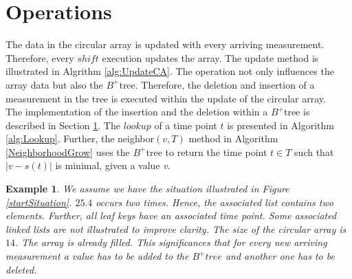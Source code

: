 \documentclass[abstracton,12pt]{scrreprt}
\newtheorem{example}{Example}
\begin{document}
\section{Operations}
\label{sec:OperationsOnBTree}
The data in the circular array is updated with every arriving measurement. Therefore, every $shift$ execution updates the array. The update method is illustrated in Algrithm \ref{alg:UpdateCA}. The operation not only influences the array data but also the $B^+$tree. Therefore, the deletion and insertion of a measurement in the tree is executed within the update of the circular array.\\ The implementation of the insertion and the deletion within a $B^+$tree is described in Section \ref{sec:OperationsOnBTree}. The $lookup$ of a time point $t$ is presented in Algorithm \ref{alg:Lookup}.
Further, the neighbor$(v,T)$ method in Algorithm \ref{NeighborhoodGrow} uses the $B^+$tree to return the time point $t \in T$ such that $|v-s(t)|$ is minimal, given a value \emph{v}.

\begin{example}
We assume we have the situation illustrated in Figure \ref{startSituation}. $25.4$ occurs two times. Hence, the associated list contains two elements. Further, all leaf keys have an associated time point. Some associated linked lists are not illustrated to improve clarity. The size of the circular array is $14$. The array is already filled. This significances that for every new arriving measurement a value has to be added to the $B^+tree$ and another one has to be deleted. 
\end{example}
\end{document}
